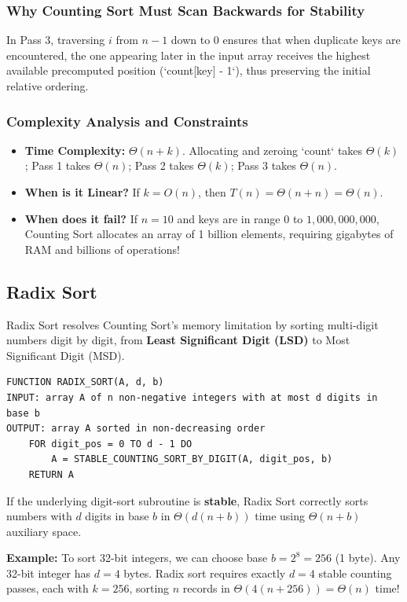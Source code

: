\documentclass[11pt,a4paper]{article}
\begin{document}
\subsubsection{Why Counting Sort Must Scan Backwards for Stability}
In Pass 3, traversing $i$ from $n-1$ down to $0$ ensures that when duplicate keys are encountered, the one appearing later in the input array receives the highest available precomputed position (`count[key] - 1`), thus preserving the initial relative ordering.

\subsubsection{Complexity Analysis and Constraints}
\begin{itemize}[itemsep=2pt]
    \item \textbf{Time Complexity:} $\Theta(n + k)$. Allocating and zeroing `count` takes $\Theta(k)$; Pass 1 takes $\Theta(n)$; Pass 2 takes $\Theta(k)$; Pass 3 takes $\Theta(n)$.
    \item \textbf{When is it Linear?} If $k = O(n)$, then $T(n) = \Theta(n + n) = \Theta(n)$.
    \item \textbf{When does it fail?} If $n = 10$ and keys are in range $0$ to $1,000,000,000$, Counting Sort allocates an array of 1 billion elements, requiring gigabytes of RAM and billions of operations!
\end{itemize}

\subsection{Radix Sort}
Radix Sort resolves Counting Sort's memory limitation by sorting multi-digit numbers digit by digit, from \textbf{Least Significant Digit (LSD)} to Most Significant Digit (MSD).

\begin{lstlisting}[style=pseudostyle]
FUNCTION RADIX_SORT(A, d, b)
INPUT: array A of n non-negative integers with at most d digits in base b
OUTPUT: array A sorted in non-decreasing order
    FOR digit_pos = 0 TO d - 1 DO
        A = STABLE_COUNTING_SORT_BY_DIGIT(A, digit_pos, b)
    RETURN A
\end{lstlisting}

\begin{theorembox}
If the underlying digit-sort subroutine is \textbf{stable}, Radix Sort correctly sorts numbers with $d$ digits in base $b$ in $\Theta(d(n + b))$ time using $\Theta(n + b)$ auxiliary space.
\end{theorembox}
\textbf{Example:} To sort 32-bit integers, we can choose base $b = 2^8 = 256$ (1 byte). Any 32-bit integer has $d = 4$ bytes. Radix sort requires exactly $d = 4$ stable counting passes, each with $k = 256$, sorting $n$ records in $\Theta(4(n + 256)) = \Theta(n)$ time!
\end{document}
